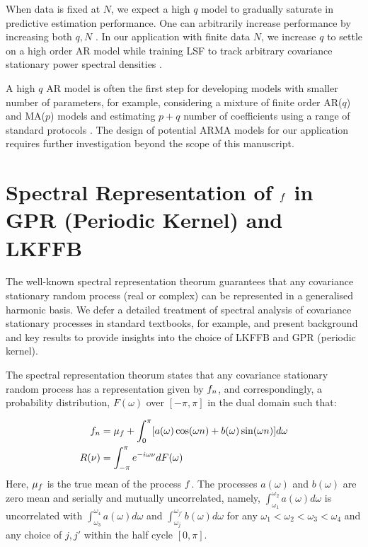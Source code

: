 When data is fixed at $N$, we expect a high $q$ model to gradually saturate in predictive estimation performance. One can arbitrarily increase performance by increasing both $q, N$ \cite{wahlberg1989estimation}.  In our application with finite data $N$, we increase $q$ to settle on a high order AR model while training LSF to track arbitrary covariance stationary power spectral densities \cite{brockwell1996introduction}.

A high $q$ AR model is often the first step for developing models with smaller number of parameters, for example, considering a mixture of finite order AR($q$) and MA($p$) models and estimating $p+q$ number of coefficients using a range of standard protocols \cite{brockwell1996introduction,west1996bayesian}. The design of potential ARMA models for our application requires further investigation beyond the scope of this manuscript.

\clearpage
\section{Spectral Representation of $f$ in GPR (Periodic Kernel) and LKFFB} \label{sec:app:spec_methods}

 The well-known spectral representation theorum  guarantees that any covariance stationary random process (real or complex) can be represented in a generalised harmonic basis.  We defer a detailed treatment of spectral analysis of covariance stationary processes in standard textbooks, for example, \cite{hamilton1994time,karlin1975first} and present background and key results to provide insights into the choice of LKFFB and GPR (periodic kernel).
 
 The spectral representation theorum states that any covariance stationary random process has a representation given by $f_n$, and correspondingly,  a probability distribution, $F(\omega)$ over $[-\pi, \pi]$ in the dual domain such that:
 
\begin{align}
f_n & = \mu_f + \int_{0}^{\pi} [ a(\omega) \cos(\omega n) +  b(\omega) \sin(\omega n) ] d\omega \\
R(\nu) & = \int_{-\pi}^{\pi} e^{-i\omega \nu } dF(\omega)
\end{align}
Here, $\mu_f $ is the true mean of the process $f$.  The processes $a(\omega) $ and $b(\omega)$ are zero mean and serially and mutually uncorrelated, namely, $\int_{\omega_1}^{\omega_{2}} a(\omega) d\omega$ is uncorrelated with $\int_{\omega_3}^{\omega_{4}} a(\omega) d\omega$ and $\int_{\omega_j}^{\omega_{j'}} b(\omega) d\omega$ for any $\omega_1 < \omega_2 < \omega_3 < \omega_4$ and any choice of $j, j'$ within the half cycle  $[0, \pi]$.


